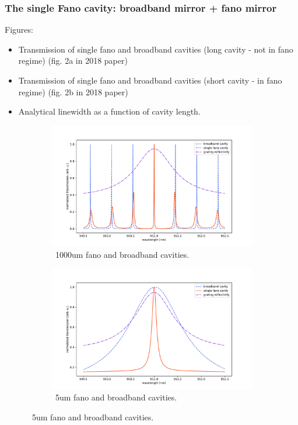 \subsubsection{The single Fano cavity: broadband mirror + fano mirror}

Figures:
\begin{itemize}
    \item Transmission of single fano and broadband cavities (long cavity - not in fano regime) (fig. 2a in 2018 paper)
    \item Transmission of single fano and broadband cavities (short cavity - in fano regime) (fig. 2b in 2018 paper)
    \item Analytical linewidth as a function of cavity length.
\end{itemize}

\begin{figure}
    \centering
    \begin{subfigure}[b]{0.4\textwidth}
        \includegraphics[width=\textwidth]{figures/fano_and_broadband_cavity_1000um.pdf}
        \caption{~1000um fano and broadband cavities.}
    \end{subfigure}
    \begin{subfigure}[b]{0.4\textwidth}
        \includegraphics[width=\textwidth]{figures/fano_and_broadband_cavity_5um.pdf}
        \caption{~5um fano and broadband cavities.}
    \end{subfigure}
\end{figure}

